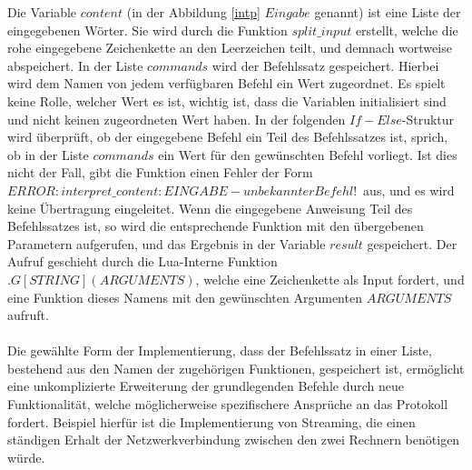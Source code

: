 Die Variable $content$ (in der Abbildung \ref{intp} $Eingabe$ genannt) ist eine Liste der eingegebenen Wörter. Sie wird durch die Funktion $split\_input$ erstellt, welche die rohe eingegebene Zeichenkette an den Leerzeichen teilt, und demnach wortweise abspeichert. In der Liste $commands$ wird der Befehlssatz gespeichert. 
Hierbei wird dem Namen von jedem verfügbaren Befehl ein Wert zugeordnet. Es spielt keine Rolle, welcher Wert es ist, wichtig ist, dass die Variablen initialisiert sind und nicht keinen zugeordneten Wert haben. 
In der folgenden $If-Else$-Struktur wird überprüft, ob der eingegebene Befehl ein Teil des Befehlssatzes ist, sprich, ob in der Liste $commands$ ein Wert für den gewünschten Befehl vorliegt. 
Ist dies nicht der Fall, gibt die Funktion einen Fehler der Form \glqq$ERROR: interpret\_content: EINGABE - unbekannter Befehl!$\grqq\ aus, und es wird keine Übertragung eingeleitet. 
Wenn die eingegebene Anweisung Teil des Befehlssatzes ist, so wird die entsprechende Funktion mit den übergebenen Parametern aufgerufen, und das Ergebnis in der Variable $result$ gespeichert. 
Der Aufruf geschieht durch die Lua-Interne Funktion $.G[STRING](ARGUMENTS)$, welche eine Zeichenkette als Input fordert, und eine Funktion dieses Namens mit den gewünschten Argumenten $ARGUMENTS$ aufruft.\\\\
Die gewählte Form der Implementierung, dass der Befehlssatz in einer Liste, bestehend aus den Namen der zugehörigen Funktionen, gespeichert ist, ermöglicht eine unkomplizierte Erweiterung der grundlegenden Befehle durch neue Funktionalität, welche möglicherweise spezifischere Ansprüche an das Protokoll fordert. 
Beispiel hierfür ist die Implementierung von Streaming, die einen ständigen Erhalt der Netzwerkverbindung zwischen den zwei Rechnern benötigen würde. \\
